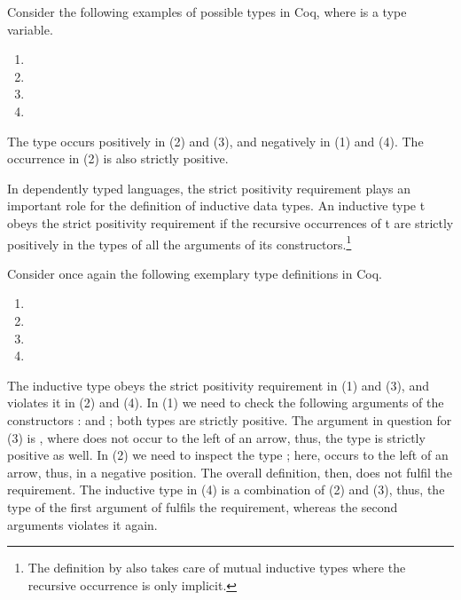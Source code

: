 \begin{excursus}
Consider the following examples of possible types in Coq, where
 is a type variable.

\begin{enumerate}
\item[(1)] 
\item[(2)] 
\item[(3)] 
\item[(4)] 
\end{enumerate}

The type  occurs positively in (2) and (3), and negatively in
(1) and (4).
The occurrence in (2) is also strictly positive.

In dependently typed languages, the strict positivity
requirement plays an important role for the definition of inductive
data types.
An inductive type t obeys the strict positivity requirement if the
recursive occurrences of t are strictly positively in the types of all
the arguments of its constructors.\footnote{The definition by
  \citeauthor{blanqui2002inductivedatatype} also takes care of mutual
  inductive types where the recursive occurrence is only implicit.}

Consider once again the following exemplary type definitions in Coq.

\begin{enumerate}
\item[(1)] 
\item[(2)] 
\item[(3)] 
\item[(4)] 
\end{enumerate}

The inductive type  obeys the strict positivity requirement in
(1) and (3), and violates it in (2) and (4).
In (1) we need to check the following arguments of the constructors
:  and ; both types are strictly positive.
The argument in question for (3) is , where 
does not occur to the left of an arrow, thus, the type is strictly
positive as well.
In (2) we need to inspect the type ; here, 
occurs to the left of an arrow, thus, in a negative position.
The overall definition, then, does not fulfil the requirement.
The inductive type in (4) is a combination of (2) and (3), thus, the
type of the first argument of  fulfils the requirement,
whereas the second arguments violates it again.
\end{excursus}

